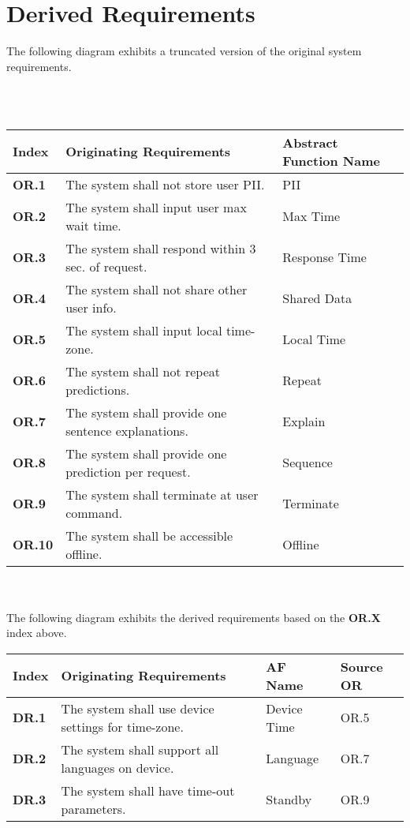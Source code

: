 \documentclass{article}
\begin{document}
\newpage
\section*{Derived Requirements}
The following diagram exhibits a truncated version of the original system requirements.

\\~\\
\begin{tabular}{ | m{28pt} | m{232pt}| m{124pt} | }
    \hline
    \textbf{Index} & \textbf{Originating Requirements} & \textbf{Abstract Function Name} \\ 
    \hline
    \textbf{OR.1} & The system shall not store user PII. &  PII \\ 
    \hline
    \textbf{OR.2} & The system shall input user max wait time. & Max Time \\ 
    \hline
    \textbf{OR.3} & The system shall respond within 3 sec. of request. & Response Time \\ 
    \hline
    \textbf{OR.4} & The system shall not share other user info. & Shared Data \\ 
    \hline
    \textbf{OR.5} & The system shall input local time-zone. & Local Time \\ 
    \hline
    \textbf{OR.6} & The system shall not repeat predictions. & Repeat \\ 
    \hline
    \textbf{OR.7} & The system shall provide one sentence explanations. & Explain \\ 
    \hline
    \textbf{OR.8} & The system shall provide one prediction per request. & Sequence \\ 
    \hline
    \textbf{OR.9} & The system shall terminate at user command. & Terminate \\ 
    \hline
    \textbf{OR.10} & The system shall be accessible offline. & Offline \\ 
    \hline
\end{tabular}
\\~\\

The following diagram exhibits the derived requirements based on the \textbf{OR.X} index above.\\

\begin{tabular}{ | m{28pt} | m{232pt}| m{56pt} | m{56pt} |}
    \hline
    \textbf{Index} & \textbf{Originating Requirements} & \textbf{AF Name} & \textbf{Source OR}\\ 
    \hline
    \textbf{DR.1} & The system shall use device settings for time-zone. &  Device Time  & OR.5\\ 
    \hline
    \textbf{DR.2} & The system shall support all languages on device. &  Language  & OR.7\\ 
    \hline
    \textbf{DR.3} & The system shall have time-out parameters. &  Standby  & OR.9\\ 
    \hline
\end{tabular}
\end{document}
